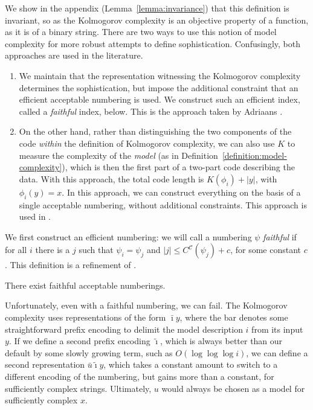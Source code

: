 \documentclass{style/llncs}
\newcommand{\C}{\mathscr C}
\begin{document}
We show in the appendix (Lemma~\ref{lemma:invariance}) that this definition is invariant, so as the Kolmogorov complexity is an objective property of a function, as it is of a binary string. There are two ways to use this notion of model complexity for more robust attempts to define sophistication. Confusingly, both approaches are used in the literature.
\begin{enumerate}
  \item We maintain that the representation witnessing the Kolmogorov complexity determines the sophistication, but impose the additional constraint that an efficient acceptable numbering is used. We construct such an efficient index, called a \emph{faithful} index, below. This is the approach taken by Adriaans \cite{adriaans2012facticity}.
  \item On the other hand, rather than distinguishing the two components of the code \emph{within} the definition of Kolmogorov complexity, we can also use $K$ to measure the complexity of the \emph{model} (as in Definition~\ref{definition:model-complexity}), which is then the first part of a two-part code describing the data. With this approach, the total code length is $K(\phi_i)+|y|$, with $\phi_i(y)=x$. In this approach, we can construct everything on the basis of a single acceptable numbering, without additional constraints. This approach is used in  \cite{cover1985kolmogorov,gacs2001algorithmic,vitanyi2004meaningful,gellmann1996information}.
\end{enumerate}
We first construct an efficient numbering: we will call a numbering $\psi$ \emph{faithful} if for all $i$ there is a $j$ such that $\psi_i=\psi_j$ and $|j|\le C^{\C}(\psi_j)+c$, for some constant $c$. This definition is a refinement of \cite[Definition~10]{adriaans2012facticity}. 

\begin{lemma}
There exist faithful acceptable numberings.
\end{lemma}

Unfortunately, even with a faithful numbering, we can fail. The Kolmogorov complexity uses representations of the form $\bar\imath y$, where the bar denotes some straightforward prefix encoding to delimit the model description $i$ from its input $y$. If we define a second prefix encoding $\tilde{\imath}$, which is always better than our default by some slowly growing term, such as $O(\log\log\log i)$, we can define a second representation $\bar u \tilde \imath y$, which takes a constant amount to switch to a different encoding of the numbering, but gains more than a constant, for sufficiently complex strings. Ultimately, $u$ would always be chosen as a model for sufficiently complex $x$.
\end{document}
